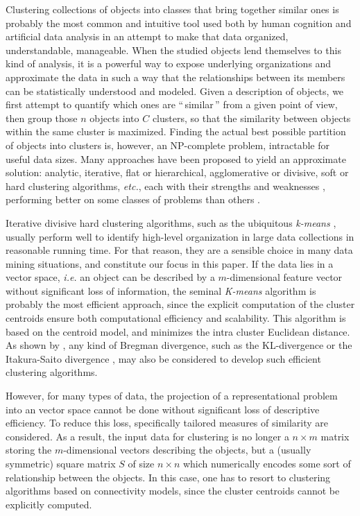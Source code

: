 \documentclass[twoside,11pt]{article}
\begin{document}
Clustering collections of objects into classes that bring together similar ones is probably the most common and intuitive tool used both by human cognition and artificial data analysis in an attempt to make that data organized, understandable, manageable. When the studied objects lend themselves to this kind of analysis, it is a powerful way to expose underlying organizations and approximate the data in such a way that the relationships between its members can be statistically understood and modeled. Given a description of objects, we first attempt to quantify which ones are ``\,similar\,'' from a given point of view, then group those $n$ objects into $C$ clusters, so that the similarity between objects within the same cluster is maximized. Finding the actual best possible partition of objects into clusters is, however, an NP-complete problem, intractable for useful data sizes. Many approaches have been proposed to yield an approximate solution: analytic, iterative, flat or hierarchical, agglomerative or divisive, soft or hard clustering algorithms, \textit{etc.}, each with their strengths and weaknesses \citep{jain2010data}, performing better on some classes of problems than others \citep{steinbach2000comparison,thalamuthu2006evaluation}.

Iterative divisive hard clustering algorithms, such as the ubiquitous \emph{k-means} \citep{macQueenBsmsp67}, usually perform well to identify high-level organization in large data collections in reasonable running time. For that reason, they are a sensible choice in many data mining situations, and constitute our focus in this paper.
If the data lies in a vector space, \textit{i.e.} an object can be described by a $m$-dimensional feature vector without significant loss of information, the seminal \emph{K-means} algorithm \citep{macQueenBsmsp67} is probably the most efficient approach, since the explicit computation of the cluster centroids ensure both computational efficiency and scalability. This algorithm is  based on the centroid model, and minimizes the intra cluster Euclidean distance. As shown by \citet{Banerjee:2005:CBD:1046920.1194902}, any kind of Bregman divergence, such as the KL-divergence \citep{Dhillon:2003:DIT:944919.944973} or the Itakura-Saito divergence \citep{linde:algorithm}, may also be considered to develop such efficient clustering algorithms.

However, for many types of data, the projection of a representational problem into an vector space cannot be done without significant loss of descriptive efficiency. To reduce this loss, specifically tailored measures of similarity are considered. As a result, the input data for clustering is no longer a $n \times m$ matrix storing the $m$-dimensional vectors describing the objects, but a (usually symmetric) square matrix $S$ of size $n \times n$ which numerically encodes some sort of relationship between the objects. In this case, one has to resort to clustering algorithms based on connectivity models, since the cluster centroids cannot be explicitly computed.
\end{document}
